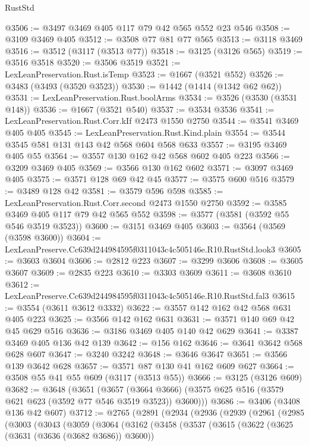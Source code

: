\begin{lexlean}{RustStd}
\begin{coremodule}
@3506 := @3497 @3469 @405 @117 @79 @42 @565 @552 @23 @546
@3508 := @3109 @3469 @405
@3512 := @3508 @77 @81 @77 @565
@3513 := @3118 @3469
@3516 := @3512 (@3117 (@3513 @77))
@3518 := @3125 (@3126 @565)
@3519 := @3516 @3518
@3520 := @3506 @3519
@3521 := LexLeanPreservation.Rust.isTemp
@3523 := @1667 (@3521 @552)
@3526 := @3483 (@3493 (@3520 @3523))
@3530 := @1442 (@1414 (@1342 @62 @62))
@3531 := LexLeanPreservation.Rust.boolArms
@3534 := @3526 (@3530 (@3531 @148))
@3536 := @1667 (@3521 @540)
@3537 := @3534 @3536
@3541 := LexLeanPreservation.Rust.Corr.kIf @2473 @1550 @2750
@3544 := @3541 @3469 @405 @405
@3545 := LexLeanPreservation.Rust.Kind.plain
@3554 := @3544 @3545 @581 @131 @143 @42 @568 @604 @568 @633
@3557 := @3195 @3469 @405 @55
@3564 := @3557 @130 @162 @42 @568 @602 @405 @223
@3566 := @3209 @3469 @405
@3569 := @3566 @130 @162 @602
@3571 := @3097 @3469 @405
@3575 := @3571 @128 @69 @42 @45
@3577 := @3575 @600 @516
@3579 := @3489 @128 @42
@3581 := @3579 @596 @598
@3585 := LexLeanPreservation.Rust.Corr.second @2473 @1550 @2750
@3592 := @3585 @3469 @405 @117 @79 @42 @565 @552
@3598 := @3577 (@3581 (@3592 @55 @546 @3519 @3523))
@3600 := @3151 @3469 @405
@3603 := @3564 (@3569 (@3598 @3600))
@3604 := LexLeanPreserve.Cc639d244984595f0311043c4c505146e.R10.RustStd.look3
@3605 := @3603 @3604
@3606 := @2812 @223
@3607 := @3299 @3606
@3608 := @3605 @3607
@3609 := @2835 @223
@3610 := @3303 @3609
@3611 := @3608 @3610
@3612 := LexLeanPreserve.Cc639d244984595f0311043c4c505146e.R10.RustStd.fal3
@3615 := @3554 (@3611 @3612 @3332)
@3622 := @3557 @142 @162 @42 @568 @631 @405 @223
@3625 := @3566 @142 @162 @631
@3631 := @3571 @140 @69 @42 @45 @629 @516
@3636 := @3186 @3469 @405 @140 @42 @629
@3641 := @3387 @3469 @405 @136 @42 @139
@3642 := @156 @162
@3646 := @3641 @3642 @568 @628 @607
@3647 := @3240 @3242
@3648 := @3646 @3647
@3651 := @3566 @139 @3642 @628
@3657 := @3571 @87 @130 @41 @162 @609 @627
@3664 := @3508 @55 @41 @55 @609 (@3117 (@3513 @55))
@3666 := @3125 (@3126 @609)
@3682 := @3648
    (@3651
      (@3657 (@3664 @3666) (@3575 @625 @516 (@3579 @621 @623 (@3592 @77 @546 @3519 @3523)) @3600)))
@3686 := @3406 (@3408 @136 @42 @607)
@3712 := @2765
    (@2891
      (@2934
        (@2936
          (@2939
            (@2961
              (@2985
                (@3003
                  (@3043
                    (@3059
                      (@3064
                        (@3162
                          (@3458
                            (@3537
                              (@3615
                                (@3622
                                  (@3625 (@3631 (@3636 (@3682 @3686)) @3600))

\end{coremodule}
\end{lexlean}
